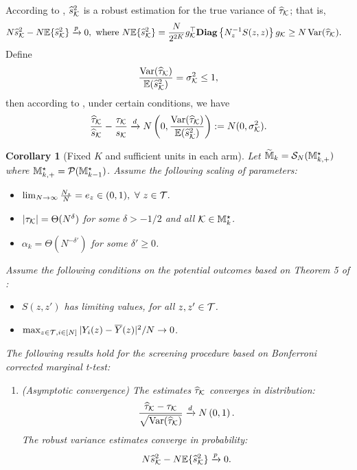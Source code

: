 \documentclass[12pt]{article}
\newtheorem{corollary}{Corollary}
\begin{document}
{    According to \cite{zhao2021regression}, $\widehat{s}^2_{\mathcal{K}}$ is a robust  estimation for the true variance of ${\widehat{\tau}}_{\mathcal{K}}$; that is,
    \begin{align*}
        &N\widehat{s}_{\mathcal{K}}^2 - N{\mathbb{E}}\{\widehat{s}_{\mathcal{K}}^2\}\xrightarrow{p} 0,
        ~\text{where } N{\mathbb{E}}\{\widehat{s}_{\mathcal{K}}^2\} = \frac{N}{2^{2K}} g^\top_{\mathcal{K}} \text{\bfseries Diag}\left\{N_z^{-1}{S}(z,z)\right\} g_{\mathcal{K}} \ge N\operatorname{Var}({\widehat{\tau}}_{{\mathcal{K}}}).
    \end{align*}
    Define 
    \begin{align*}
        \frac{\operatorname{Var}({\widehat{\tau}}_{\mathcal{K}})}{{\mathbb{E}}(\widehat{s}^2_{\mathcal{K}})} = \sigma_{\mathcal{K}}^2 \le 1,
    \end{align*}
    then according to \cite{li2017general}, under certain conditions,  we have 
    \begin{align*}
        \frac{{\widehat{\tau}}_{{\mathcal{K}}}}{\widehat{s}_{\mathcal{K}}} - \frac{\tau_{\mathcal{K}}}{s_{\mathcal{K}}} \xrightarrow{d} N\left(0,\frac{\operatorname{Var}({\widehat{\tau}}_{\mathcal{K}})}{{\mathbb{E}}(\widehat{s}^2_{\mathcal{K}})}\right) : = N(0,\sigma_{\mathcal{K}}^2).
    \end{align*}


\begin{corollary}[Fixed $K$ and sufficient units in each arm]\label{cor:marginal-t}
Let $\widetilde{{\mathbb{M}}}_{k} = {\mathcal{S}}_N({\mathbb{M}}^{\star}_{k,+})$ where ${\mathbb{M}}^{\star}_{k,+} = {\mathcal{P}}({\mathbb{M}}^{\star}_{k-1})$. Assume the following scaling of parameters:
\begin{itemize}
    \item $\lim_{N\to\infty} \frac{N_z}{N} = e_z\in(0,1),~\forall ~ z\in{\mathcal{T}}.$
    \item $|\tau_{\mathcal{K}}| =  \Theta(N^\delta)$ for some $\delta > -1/2$ and all ${\mathcal{K}}\in{\mathbb{M}}_k^\star$.
    \item ${\alpha_k} =  \Theta(N^{-\delta'})$ for some $\delta'\ge 0$.
\end{itemize} 
Assume the following conditions on the potential outcomes based on Theorem 5 of \cite{li2017general}:
\begin{itemize}
    \item $S(z,z')$ has limiting values, for all $z,z'\in{\mathcal{T}}$. 
    \item $\max_{z\in{\mathcal{T}},i\in[N]} |Y_i(z) - \overline{Y}(z)|^2 /N \to 0$.
\end{itemize}
The following results hold for the  screening procedure based on Bonferroni corrected marginal t-test:
\begin{enumerate}
    \item (Asymptotic convergence) The estimates ${\widehat{\tau}}_{\mathcal{K}}$ converges in distribution:
    \begin{align*}
        \frac{{\widehat{\tau}}_{{\mathcal{K}}} - \tau_{\mathcal{K}}}{\sqrt{\operatorname{Var}({\widehat{\tau}}_{\mathcal{K}})}} \xrightarrow{d} N\left(0,1\right).
    \end{align*}
    The robust variance estimates converge in probability:
    \begin{align*}
        N\widehat{s}^2_{\mathcal{K}} - N{\mathbb{E}}\{\widehat{s}_{\mathcal{K}}^2\} \xrightarrow{p} 0.
    \end{align*}
    

\end{enumerate}
\end{corollary}}
\end{document}
